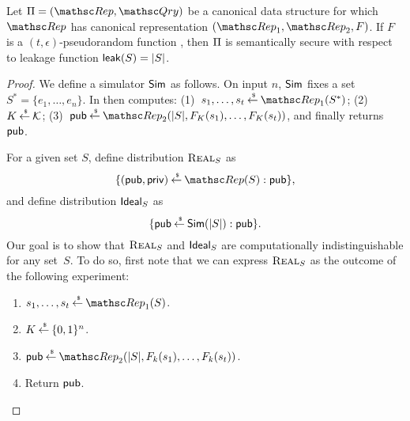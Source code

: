 \begin{theorem}
Let $\setprim=(\Rep, \Qry)$ be a canonical data structure for which $\Rep$ has canonical representation
$(\Rep_1, \Rep_2, F)$. If $F$ is a $(t, \epsilon)$-pseudorandom
function , then $\Pi$ is semantically secure
with respect to leakage function ${\sf leak}(S) = |S|$.
\end{theorem}
\begin{proof}
We define a simulator ${\sf Sim}$ as follows. On input $n$, ${\sf Sim}$ fixes
a set $S^*=\{e_1, \ldots, e_n\}$. In then computes: (1)~$s_1,
\ldots, s_t \getsr \Rep_1(S^*)$; (2)~$K {\:\stackrel{{\scriptscriptstyle \hspace{0.2em}\$}} {\leftarrow}\:} {\cal K}$; (3)~$\pubaux
\getsr \Rep_2(|S|, F_K(s_1), \ldots, F_K(s_t))$, and finally returns
${\sf pub}$.

\def\hyb{\mbox{{\sc Hyb}}}

For a given set $S$, define distribution $\mbox{{\sc Real}}_S$ as
\[ \{ (\pubaux, \privaux) \getsr \Rep(S) : \pubaux\},\]
and define distribution $\mbox{{\sf Ideal}}_S$ as
\[ \{ {\sf pub} {\:\stackrel{{\scriptscriptstyle \hspace{0.2em}\$}} {\leftarrow}\:} {\sf Sim}(|S|) : {\sf pub} \}.\]
Our goal is to show that $\mbox{{\sc Real}}_S$ and $\mbox{{\sf Ideal}}_S$ are computationally
indistinguishable for any set~$S$. 
To do so, first note that we can express $\mbox{{\sc Real}}_S$ as the outcome of
the following experiment: 
\begin{enumerate}
\item $s_1, \ldots, s_t \getsr \Rep_1(S)$.
\item $K {\:\stackrel{{\scriptscriptstyle \hspace{0.2em}\$}} {\leftarrow}\:} \{0,1\}^n$.
\item $\pubaux \getsr \Rep_2(|S|, F_k(s_1), \ldots, F_k(s_t))$.
\item Return ${\sf pub}$.
\end{enumerate}


\end{proof}
